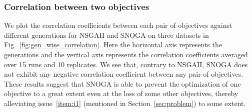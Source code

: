\subsubsection{Correlation between two objectives} We plot the correlation coefficients between each pair of objectives against different generations for NSGAII and SNOGA on three datasets in Fig.~\ref{fig:gen_wise_correlation}. Here the horizontal axis represents the generations and the vertical axis represents the correlation coefficients averaged over 15 runs and 10 replicates. We see that, contrary to NSGAII, SNOGA does not exhibit any negative correlation coefficient between any pair of objectives. These results suggest that SNOGA is able to prevent the optimization of one objective to a great extent even at the loss of some other objectives, thereby alleviating issue~\ref{item:i1} (mentioned in Section~\ref{sec:problem}) to some extent.

